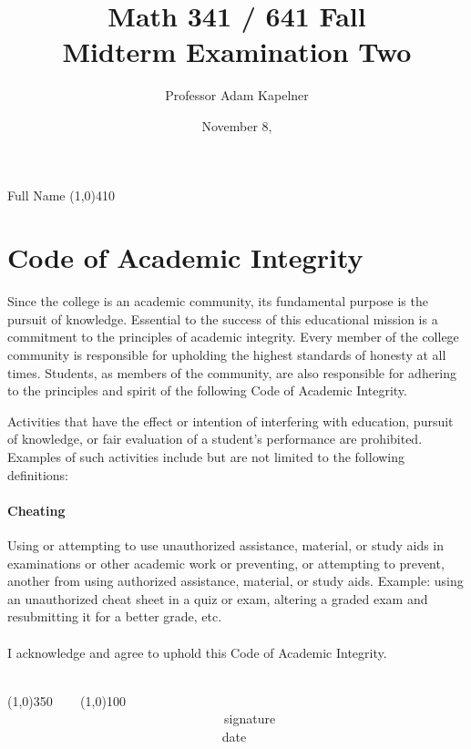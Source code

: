 \documentclass[12pt]{article}
\title{Math 341 / 641 Fall \the\year{} \\ Midterm Examination Two \inred{Solutions}}
\author{Professor Adam Kapelner}
\date{November 8, \the\year{}}
\begin{document}
\maketitle

\noindent Full Name \line(1,0){410}

\thispagestyle{empty}

\section*{Code of Academic Integrity}

\footnotesize
Since the college is an academic community, its fundamental purpose is the pursuit of knowledge. Essential to the success of this educational mission is a commitment to the principles of academic integrity. Every member of the college community is responsible for upholding the highest standards of honesty at all times. Students, as members of the community, are also responsible for adhering to the principles and spirit of the following Code of Academic Integrity.

Activities that have the effect or intention of interfering with education, pursuit of knowledge, or fair evaluation of a student's performance are prohibited. Examples of such activities include but are not limited to the following definitions:

\paragraph{Cheating} Using or attempting to use unauthorized assistance, material, or study aids in examinations or other academic work or preventing, or attempting to prevent, another from using authorized assistance, material, or study aids. Example: using an unauthorized cheat sheet in a quiz or exam, altering a graded exam and resubmitting it for a better grade, etc.\\
\\
\noindent I acknowledge and agree to uphold this Code of Academic Integrity. \\~\\

\begin{center}
\line(1,0){350} ~~~ \line(1,0){100}\\
~~~~~~~~~~~~~~~~~~~~~~~~~~~~~~~~~~signature~~~~~~~~~~~~~~~~~~~~~~~~~~~~~~~~~~~~~~~~~~~~~~~~~~~~~~~~~~~~~~ date
\end{center}

\normalsize
\end{document}
